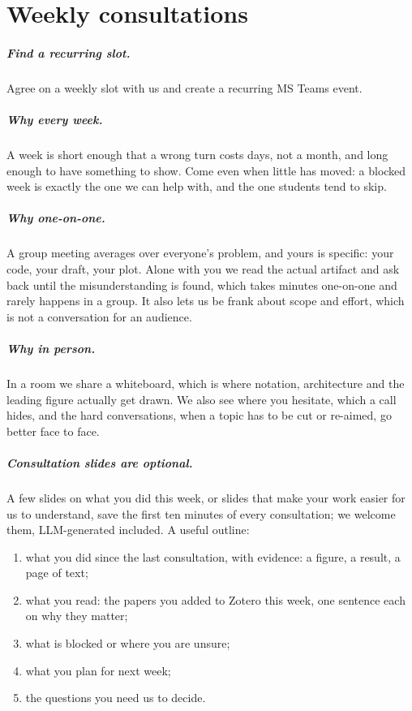 \chapter{Weekly consultations}\label{guide:consult}
\paragraph{Find a recurring slot.} Agree on a weekly slot with us and create a recurring MS Teams event.

\paragraph{Why every week.} A week is short enough that a wrong turn costs days, not a month, and long enough to have something to show. Come even when little has moved: a blocked week is exactly the one we can help with, and the one students tend to skip.

\paragraph{Why one-on-one.} A group meeting averages over everyone's problem, and yours is specific: your code, your draft, your plot. Alone with you we read the actual artifact and ask back until the misunderstanding is found, which takes minutes one-on-one and rarely happens in a group. It also lets us be frank about scope and effort, which is not a conversation for an audience.

\paragraph{Why in person.} In a room we share a whiteboard, which is where notation, architecture and the leading figure actually get drawn. We also see where you hesitate, which a call hides, and the hard conversations, when a topic has to be cut or re-aimed, go better face to face.

\paragraph{Consultation slides are optional.} A few slides on what you did this week, or slides that make your work easier for us to understand, save the first ten minutes of every consultation; we welcome them, LLM-generated included. A useful outline:
\begin{enumerate}[noitemsep]
  \item what you did since the last consultation, with evidence: a figure, a result, a page of text;
  \item what you read: the papers you added to Zotero this week, one sentence each on why they matter;
  \item what is blocked or where you are unsure;
  \item what you plan for next week;
  \item the questions you need us to decide.
\end{enumerate}

